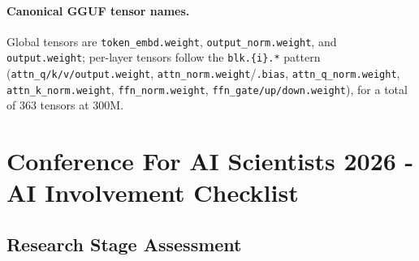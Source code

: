 \documentclass{article}
\begin{document}
\paragraph{Canonical GGUF tensor names.}
Global tensors are \texttt{token\_embd.weight}, \texttt{output\_norm.weight}, and \texttt{output.weight}; per-layer tensors follow the \texttt{blk.\{i\}.*} pattern (\texttt{attn\_q/k/v/output.weight}, \texttt{attn\_norm.weight}/\texttt{.bias}, \texttt{attn\_q\_norm.weight}, \texttt{attn\_k\_norm.weight}, \texttt{ffn\_norm.weight}, \texttt{ffn\_gate/up/down.weight}), for a total of 363 tensors at 300M.

\newpage

\section*{Conference For AI Scientists 2026 - AI Involvement Checklist}
\label{checklist_ai_involvement}

\subsection*{Research Stage Assessment}
\end{document}
